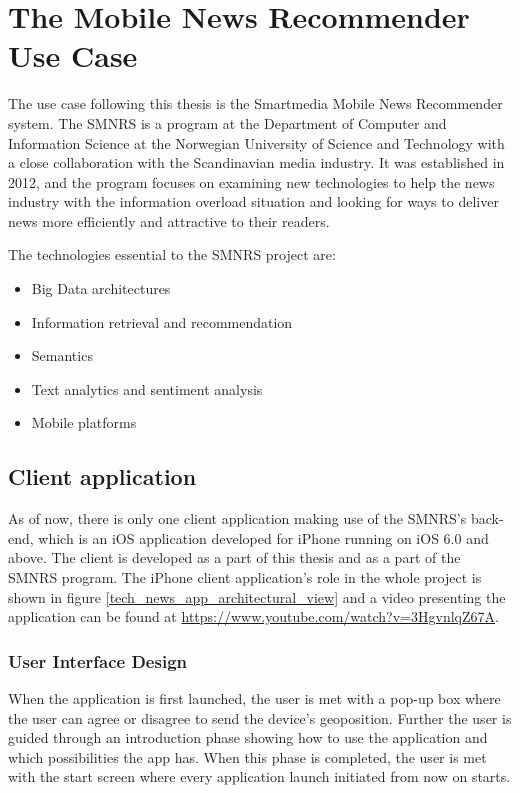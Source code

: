 \chapter{The Mobile News Recommender Use Case}
\label{chapter_usecase}

The use case following this thesis is the Smartmedia Mobile News Recommender system. The SMNRS is a program at the Department of Computer and Information Science at the Norwegian University of Science and Technology with a close collaboration with the Scandinavian media industry. It was established in 2012, and the program focuses on examining new technologies to help the news industry with the information overload situation and looking for ways to deliver news more efficiently and attractive to their readers.

The technologies essential to the SMNRS project are:

\begin{itemize}
	\item Big Data architectures
	\item Information retrieval and recommendation
	\item Semantics
	\item Text analytics and sentiment analysis
	\item Mobile platforms
\end{itemize}

\section{Client application}
\label{use_case_application}
As of now, there is only one client application making use of the SMNRS's back-end, which is an iOS application developed for iPhone running on iOS 6.0 and above. The client is developed as a part of this thesis and as a part of the SMNRS program. The iPhone client application's role in the whole project is shown in figure \ref{tech_news_app_architectural_view} and a video presenting the application can be found at \url{https://www.youtube.com/watch?v=3HgvnlqZ67A}.

\subsection{User Interface Design}
When the application is first launched, the user is met with a pop-up box where the user can agree or disagree to send the device's geoposition. Further the user is guided through an introduction phase showing how to use the application and which possibilities the app has. When this phase is completed, the user is met with the start screen where every application launch initiated from now on starts.

